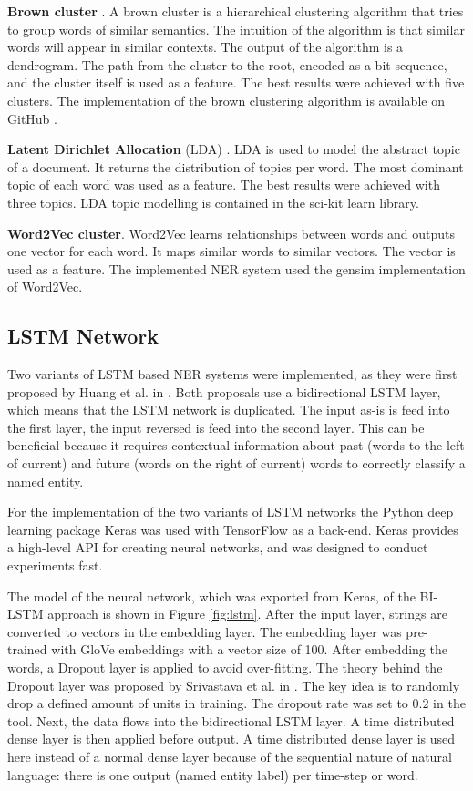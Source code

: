 \documentclass[12pt]{book}
\begin{document}
	\textbf{Brown cluster} \cite{brown1992class}. A brown cluster is a hierarchical clustering algorithm that tries to group words of similar semantics. The intuition of the algorithm is that similar words will appear in similar contexts. The output of the algorithm is a dendrogram. The path from the cluster to the root, encoded as a bit sequence, and the cluster itself is used as a feature. The best results were achieved with five clusters. The implementation of the brown clustering algorithm is available on GitHub \cite{brownimp}.
	
	\textbf{Latent Dirichlet Allocation} (LDA) \cite{blei2003latent}. LDA is used to model the abstract topic of a document. It returns the distribution of topics per word. The most dominant topic of each word was used as a feature. The best results were achieved with three topics. LDA topic modelling is contained in the sci-kit learn \cite{scikitlearn} library.
	
	\textbf{Word2Vec cluster}. Word2Vec learns relationships between words and outputs one vector for each word. It maps similar words to similar vectors. The vector is used as a feature. The implemented NER system used the gensim \cite{w2vgensim} implementation of Word2Vec.
	
	\subsection{LSTM Network}
	\label{sub:lstm}
	
	Two variants of LSTM based NER systems were implemented, as they were first proposed by Huang et al. in \cite{huang2015bidirectional}.  Both proposals use a bidirectional LSTM layer, which means that the LSTM network is duplicated. The input as-is is feed into the first layer, the input reversed is feed into the second layer. This can be beneficial because it requires contextual information about past (words to the left of current) and future (words on the right of current) words to correctly classify a named entity.
	
	
	For the implementation of the two variants of LSTM networks the Python deep learning package Keras \cite{keras} was used with TensorFlow \cite{tensorflow} as a back-end. Keras provides a high-level API for creating neural networks, and was designed to conduct experiments fast.
	

	The model of the neural network, which was exported from Keras, of the BI-LSTM approach is shown in Figure \ref{fig:lstm}. After the input layer, strings are converted to vectors in the embedding layer. The embedding layer was pre-trained with GloVe \cite{glove} embeddings with a vector size of 100. After embedding the words, a Dropout layer is applied to avoid over-fitting. The theory behind the Dropout layer was proposed by Srivastava et al. in \cite{srivastava2014dropout}. The key idea is to randomly drop a defined amount of units in training. The dropout rate was set to $0.2$ in the tool. Next, the data flows into the bidirectional LSTM layer. A time distributed dense layer is then applied before output. A time distributed dense layer is used here instead of a normal dense layer because of the sequential nature of natural language: there is one output (named entity label) per time-step or word.
\end{document}
